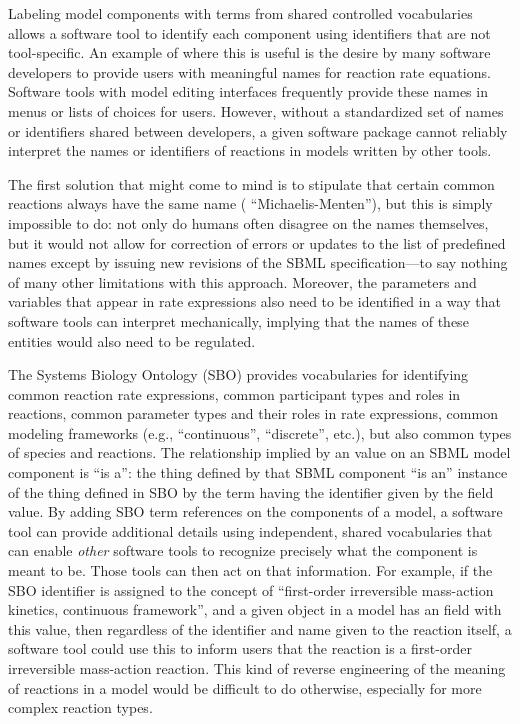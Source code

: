 Labeling model components with terms from shared controlled
vocabularies allows a software tool to identify each component using
identifiers that are not tool-specific.  An example of where this
is useful is the desire by many software developers to provide
users with meaningful names for reaction rate equations.  Software
tools with model editing interfaces frequently provide these names
in menus or lists of choices for users.  However, without a
standardized set of names or identifiers shared between
developers, a given software package cannot reliably interpret the
names or identifiers of reactions in models written by other
tools.

The first solution that might come to mind is to stipulate that
certain common reactions always have the same name (\eg
``Michaelis-Menten''), but this is simply impossible to do: not
only do humans often disagree on the names themselves, but it
would not allow for correction of errors or updates to the list of
predefined names except by issuing new revisions of the SBML
specification---to say nothing of many other limitations with this
approach.  Moreover, the parameters and variables that appear in
rate expressions also need to be identified in a way that software
tools can interpret mechanically, implying that the names of these
entities would also need to be regulated.

The Systems Biology Ontology (SBO) provides vocabularies for
identifying common reaction rate expressions, common
participant types and roles in reactions, common parameter
types and their roles in rate expressions, common modeling
frameworks (e.g., ``continuous'', ``discrete'', etc.), but also common types of species and reactions.  The
relationship implied by an  value on an SBML model
component is ``is a'': the thing defined by that SBML component
``is an'' instance of the thing defined in SBO by the term having the
identifier given by the  field value.  By adding
SBO term references on the components of a model, a software tool
can provide additional details using independent, shared
vocabularies that can enable \emph{other} software tools to
recognize precisely what the component is meant to be.  Those
tools can then act on that information.  For example, if the SBO
identifier  is assigned to the concept of
``first-order irreversible mass-action kinetics, continuous
framework'', and a given \KineticLaw object in a model has an
 field with this value, then regardless of the
identifier and name given to the reaction itself, a software tool
could use this to inform users that the reaction is a first-order
irreversible mass-action reaction.  This kind of reverse
engineering of the meaning of reactions in a model would be
difficult to do otherwise, especially for more complex reaction
types.

